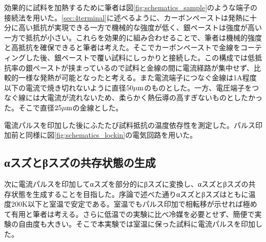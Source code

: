 効果的に試料を加熱するために筆者は図\ref{fig:schematics_sample}のような端子の接続法を用いた。\ref{sec:4terminal}に述べるように、カーボンペーストは発熱に十分に高い抵抗が実現できる一方で機械的な強度が低く、銀ペーストは強度が高い一方で抵抗が小さい。これらを効果的に組み合わせることで、筆者は機械的強度と高抵抗を確保できると筆者は考えた。そこでカーボンペーストで金線をコーティングした後、銀ペーストで覆い試料にしっかりと接続した。この構成では低抵抗率の銀ペーストが挟まっているので試料と金線の間に電流経路が集中せず、比較的一様な発熱が可能となったと考える。また電流端子につなぐ金線は1A程度以下の電流で焼き切れないように直径$\rm 50 \mu m$のものとした。一方、電圧端子をつなぐ線には大電流が流れないため、柔らかく熱伝導の高すぎないものとしたかった。そこで直径$\rm 25 \mu m$の金線とした。

電流パルスを印加した後にふたたび試料抵抗の温度依存性を測定した。パルス印加前と同様に図\ref{fig:schematics_lockin}の電気回路を用いた。

\subsection{αスズとβスズの共存状態の生成}
次に電流パルスを印加してαスズを部分的にβスズに変換し、αスズとβスズの共存状態を生成することを目指した。序論で述べた通りαスズとβスズはともに温度200K以下と室温で安定である。室温でもパルス印加で相転移が示せれば極めて有用と筆者は考える。さらに低温での実験に比べ冷媒を必要とせず、簡便で実験の自由度も大きい。そこで本実験では室温に保った試料に電流パルスを印加した。

